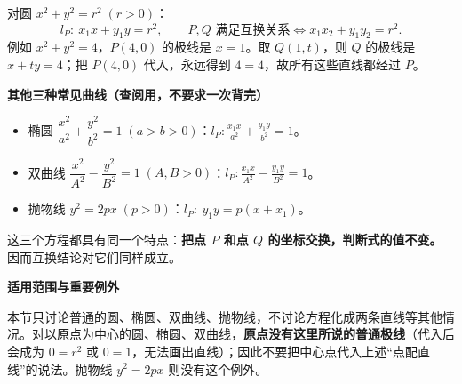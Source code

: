 \begin{statementbox}
对圆 $x^2+y^2=r^2\;(r>0)$：
\[
\boxed{l_P:\ x_1x+y_1y=r^2},\qquad
\boxed{P,Q\text{ 满足互换关系}\iff x_1x_2+y_1y_2=r^2}.
\]
例如 $x^2+y^2=4$，$P(4,0)$ 的极线是 $x=1$。取 $Q(1,t)$，则 $Q$ 的极线是 $x+ty=4$；把 $P(4,0)$ 代入，永远得到 $4=4$，故所有这些直线都经过 $P$。

\medskip
\textbf{\textcolor{CStatement}{其他三种常见曲线（查阅用，不要求一次背完）}}
\begin{itemize}[leftmargin=*,itemsep=0.35em]
\item 椭圆 $\dfrac{x^2}{a^2}+\dfrac{y^2}{b^2}=1\;(a>b>0)$：$\displaystyle l_P:\frac{x_1x}{a^2}+\frac{y_1y}{b^2}=1$。
\item 双曲线 $\dfrac{x^2}{A^2}-\dfrac{y^2}{B^2}=1\;(A,B>0)$：$\displaystyle l_P:\frac{x_1x}{A^2}-\frac{y_1y}{B^2}=1$。
\item 抛物线 $y^2=2px\;(p>0)$：$\displaystyle l_P:\ y_1y=p(x+x_1)$。
\end{itemize}
这三个方程都具有同一个特点：\textbf{把点 $P$ 和点 $Q$ 的坐标交换，判断式的值不变。} 因而互换结论对它们同样成立。

\medskip
\textbf{\textcolor{CStatement}{适用范围与重要例外}}

本节只讨论普通的圆、椭圆、双曲线、抛物线，不讨论方程化成两条直线等其他情况。对以原点为中心的圆、椭圆、双曲线，\textbf{原点没有这里所说的普通极线}（代入后会成为 $0=r^2$ 或 $0=1$，无法画出直线）；因此不要把中心点代入上述“点配直线”的说法。抛物线 $y^2=2px$ 则没有这个例外。
\end{statementbox}
